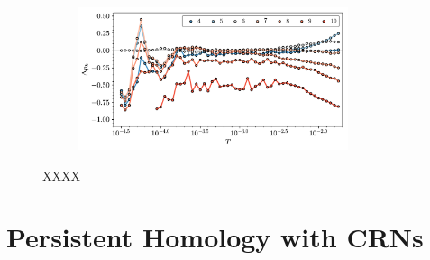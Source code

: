 \begin{figure}[tb]
      \begin{subfigure}[b]{0.96\textwidth}
         \centering
         \includegraphics[width=0.87\textwidth]{./figures/ph/tr_delta_pk.pdf}
         \caption{}
         \label{fig:trpkph}
     \end{subfigure}

 
	\caption{XXXX}
	\label{fig:trpkph}
\end{figure}


\section{Persistent Homology with CRNs}

